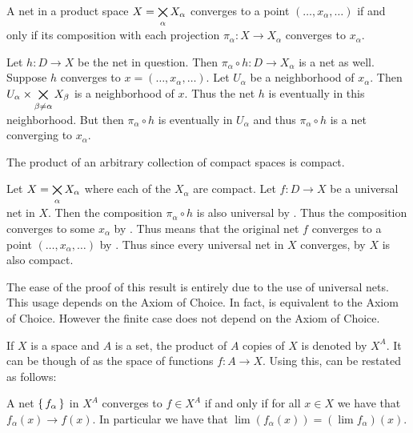 \documentclass[letterpaper, 11pt]{article}
\begin{document}
\begin{prop}\label{prop: net_of_product_converges}
  A net in a product space $X = \bigtimes\limits_{\alpha} X_{\alpha}$ converges to a point $(\ldots, x_{\alpha}, \ldots)$ if and only if its composition with each projection $\pi_{\alpha}\colon X \to X_{\alpha}$ converges to $x_{\alpha}$.
\end{prop}
\begin{pf}
  Let $h\colon D \to X$ be the net in question.
  Then $\pi_{\alpha} \circ h\colon D \to X_{\alpha}$ is a net as well.
  Suppose $h$ converges to $x = (\ldots, x_{\alpha}, \ldots)$.
  Let $U_{\alpha}$ be a neighborhood of $x_{\alpha}$.
  Then $U_{\alpha} \times \bigtimes\limits_{\beta \neq \alpha} X_{\beta}$ is a neighborhood of $x$.
  Thus the net $h$ is eventually in this neighborhood.
  But then $\pi_{\alpha} \circ h$ is eventually in $U_{\alpha}$ and thus $\pi_{\alpha} \circ h$ is a net converging to $x_{\alpha}$.

\end{pf}

\begin{thrm}\label{thrm: tychonoff}
  The product of an arbitrary collection of compact spaces is compact.
\end{thrm}
\begin{pf}
  Let $X = \bigtimes\limits_{\alpha} X_{\alpha}$ where each of the $X_{\alpha}$ are compact.
  Let $f\colon D \to X$ be a universal net in $X$.
  Then the composition $\pi_{\alpha} \circ h$ is also universal by .
  Thus the composition converges to some $x_{\alpha}$ by .
  Thus means that the original net $f$ converges to a point $(\ldots, x_{\alpha}, \ldots)$ by .
  Thus since every universal net in $X$ converges, by  $X$ is also compact.
\end{pf}

The ease of the proof of this result is entirely due to the use of universal nets.
This usage depends on the Axiom of Choice.
In fact,  is equivalent to the Axiom of Choice.
However the finite case  does not depend on the Axiom of Choice.

If $X$ is a space and $A$ is a set, the product of $A$ copies of $X$ is denoted by $X^{A}$.
It can be though of as the space of functions $f\colon A \to X$.
Using this,  can be restated as follows:
\begin{prop}
  A net $\set{f_{\alpha}}$ in $X^{A}$ converges to $f \in X^{A}$ if and only if for all $x \in X$ we have that $f_{\alpha}(x) \to f(x)$.
  In particular we have that $\lim(f_{\alpha}(x)) = (\lim f_{\alpha})(x)$.
\end{prop}
\end{document}
